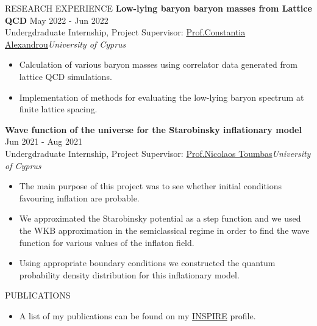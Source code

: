 \documentclass{resume} %
\begin{document}
\begin{rSection}{RESEARCH EXPERIENCE}
                \textbf{Low-lying baryon baryon masses from Lattice QCD} \hfill May 2022 - Jun 2022\\
                Undergdraduate Internship, Project Supervisor:  \href{https://www.cyi.ac.cy/index.php/castorc/about-the-center/castorc-our-people/itemlist/user/99-constantia-alexandrou.html}{Prof.\@ Constantia Alexandrou}\hfill \textit{University of Cyprus}
                \begin{itemize}
                        \itemsep -3pt {} 
                        \item Calculation of various baryon masses using correlator data generated from lattice QCD simulations.
                        \item Implementation of methods for evaluating the low-lying baryon spectrum at finite lattice spacing.
                \end{itemize}

                \textbf{Wave function of the universe for the Starobinsky inflationary model} \hfill Jun 2021 - Aug 2021\\
                Undergdraduate Internship, Project Supervisor:  \href{https://www.ucy.ac.cy/directory/en/profile/nick}{Prof.\@ Nicolaos Toumbas}\hfill \textit{University of Cyprus}
                \begin{itemize}
                        \itemsep -3pt {} 
                        \item The main purpose of this project was to see whether initial conditions favouring inflation are probable.
                        \item We approximated the Starobinsky potential as a step function and we used the WKB approximation in the semiclassical regime in order to find the wave function for various values of the inflaton field.
                        \item Using appropriate boundary conditions we constructed the quantum probability density distribution for this inflationary model.
                \end{itemize}
        \end{rSection} 

        \bigbreak

        \begin{rSection}{PUBLICATIONS}
                \begin{itemize}
                        \item A list of my publications can be found on my \href{https://inspirehep.net/authors/2313765}{INSPIRE} profile.
                \end{itemize}
        \end{rSection}
\end{document}
